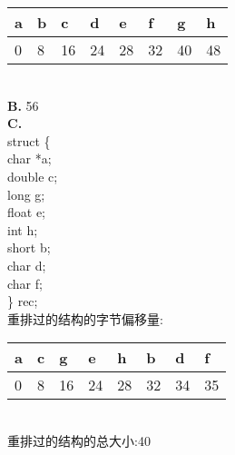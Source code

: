 \documentclass{article}
\begin{document}
\begin{CJK}{UTF8}{uyhei}
\renewcommand\arraystretch{1.4}
\begin{table}[htbp]
\centering
\begin{tabular}{|m{6em}<{\centering}|m{6em}<{\centering}|m{6em}<{\centering}|m{6em}<{\centering}|m{6em}<{\centering}|m{6em}<{\centering}|m{6em}<{\centering}|m{6em}<{\centering}|}
\hline
a	&	b	&	c	&	d	&	e	&	f	&	g	&	h	\\
\hline
0	&	8	&	16	&	24	&	28	&	32	&	40	&	48	\\
\hline
\end{tabular}
\end{table}	\\[2ex]
\textbf{B.} 56	\\[1ex]
\textbf{C.}	\\
struct \{	\\
	\hspace*{2em}char *a;	\\
	\hspace*{2em}double c;	\\
	\hspace*{2em}long g;	\\
	\hspace*{2em}float e;	\\
	\hspace*{2em}int h;	\\
	\hspace*{2em}short b;	\\
	\hspace*{2em}char d;	\\
	\hspace*{2em}char f;	\\
\} rec;	\\[4ex]
重排过的结构的字节偏移量:	\\[-3ex]
\renewcommand\arraystretch{1.4}
\begin{table}[htbp]
\centering
\begin{tabular}{|m{6em}<{\centering}|m{6em}<{\centering}|m{6em}<{\centering}|m{6em}<{\centering}|m{6em}<{\centering}|m{6em}<{\centering}|m{6em}<{\centering}|m{6em}<{\centering}|}
\hline
a	&	c	&	g	&	e	&	h	&	b	&	d	&	f	\\
\hline
0	&	8	&	16	&	24	&	28	&	32	&	34	&	35	\\
\hline
\end{tabular}
\end{table}	\\[2ex]
重排过的结构的总大小:40



\end{CJK}
\end{document}
